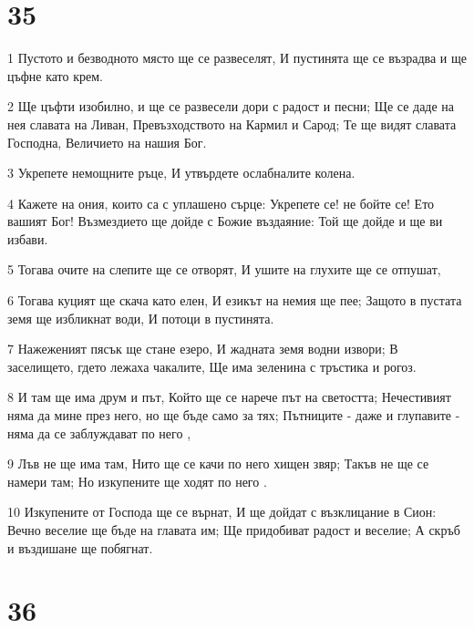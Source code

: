 \chapter{35}

\par 1 Пустото и безводното място ще се развеселят, И пустинята ще се възрадва и ще цъфне като крем.
\par 2 Ще цъфти изобилно, и ще се развесели дори с радост и песни; Ще се даде на нея славата на Ливан, Превъзходството на Кармил и Сарод; Те ще видят славата Господна, Величието на нашия Бог.
\par 3 Укрепете немощните ръце, И утвърдете ослабналите колена.
\par 4 Кажете на ония, които са с уплашено сърце: Укрепете се! не бойте се! Ето вашият Бог! Възмездието ще дойде с Божие въздаяние: Той ще дойде и ще ви избави.
\par 5 Тогава очите на слепите ще се отворят, И ушите на глухите ще се отпушат,
\par 6 Тогава куцият ще скача като елен, И езикът на немия ще пее; Защото в пустата земя ще избликнат води, И потоци в пустинята.
\par 7 Нажеженият пясък ще стане езеро, И жадната земя водни извори; В заселището, гдето лежаха чакалите, Ще има зеленина с тръстика и рогоз.
\par 8 И там ще има друм и път, Който ще се нарече път на светостта; Нечестивият няма да мине през него, но ще бъде само за тях; Пътниците - даже и глупавите - няма да се заблуждават по него ,
\par 9 Лъв не ще има там, Нито ще се качи по него хищен звяр; Такъв не ще се намери там; Но изкупените ще ходят по него .
\par 10 Изкупените от Господа ще се върнат, И ще дойдат с възклицание в Сион: Вечно веселие ще бъде на главата им; Ще придобиват радост и веселие; А скръб и въздишане ще побягнат.

\chapter{36}


